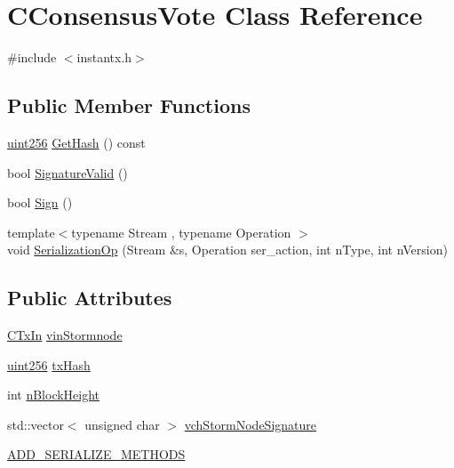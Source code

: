 \hypertarget{class_c_consensus_vote}{}\section{C\+Consensus\+Vote Class Reference}
\label{class_c_consensus_vote}


{\ttfamily \#include $<$instantx.\+h$>$}

\subsection*{Public Member Functions}
\begin{DoxyCompactItemize}
\item 
\hyperlink{classuint256}{uint256} \hyperlink{class_c_consensus_vote_a694d24883638b550aa2f823fe48ac04b}{Get\+Hash} () const 
\item 
bool \hyperlink{class_c_consensus_vote_ac6550a89acee255e0035e189a42a6310}{Signature\+Valid} ()
\item 
bool \hyperlink{class_c_consensus_vote_a687495887aa75f5d5bb70f93ecb820d0}{Sign} ()
\item 
{\footnotesize template$<$typename Stream , typename Operation $>$ }\\void \hyperlink{class_c_consensus_vote_a103f72505be81d78565e52331b6c563b}{Serialization\+Op} (Stream \&s, Operation ser\+\_\+action, int n\+Type, int n\+Version)
\end{DoxyCompactItemize}
\subsection*{Public Attributes}
\begin{DoxyCompactItemize}
\item 
\hyperlink{class_c_tx_in}{C\+Tx\+In} \hyperlink{class_c_consensus_vote_ab3a273669aecfba15f77c34d33c0ca93}{vin\+Stormnode}
\item 
\hyperlink{classuint256}{uint256} \hyperlink{class_c_consensus_vote_a3eca3f8fac54643f7f2ac863635491d6}{tx\+Hash}
\item 
int \hyperlink{class_c_consensus_vote_a19f39b69e4adf3f9b5557d465cabc7ed}{n\+Block\+Height}
\item 
std\+::vector$<$ unsigned char $>$ \hyperlink{class_c_consensus_vote_aaef3986bf440b3222751f5e7483d7ae1}{vch\+Storm\+Node\+Signature}
\item 
\hyperlink{class_c_consensus_vote_af0f1e45072c8cf14e8e00eb28a505835}{A\+D\+D\+\_\+\+S\+E\+R\+I\+A\+L\+I\+Z\+E\+\_\+\+M\+E\+T\+H\+O\+D\+S}
\end{DoxyCompactItemize}


